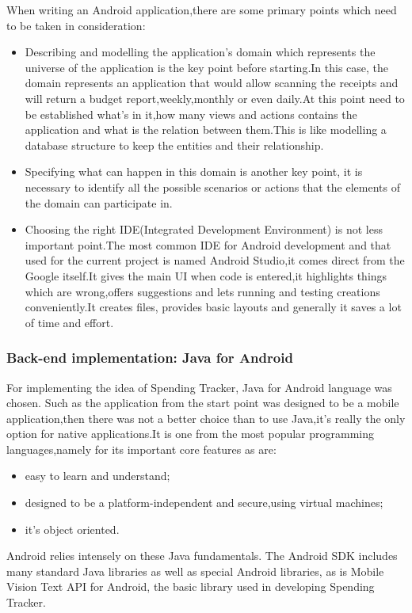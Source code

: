 When writing an Android application,there are some primary points which need to be taken in consideration:
\begin{itemize}
	\item Describing and modelling the application's domain which represents the universe of the application is the key point before starting.In this case, the domain represents an application that would allow scanning the receipts and will return a budget report,weekly,monthly or even daily.At this point need to be established what's in it,how many views and actions contains the application and what is the relation between them.This is like modelling a database structure to keep the entities and their relationship.
	\item Specifying what can happen in this domain is another key point, it is necessary to identify all the possible scenarios or actions that the elements of the domain can participate in.
	\item Choosing the right IDE(Integrated Development Environment) is not less important point.The most common IDE for Android development and that used for the current project is named Android Studio,it comes direct from the Google itself.It gives the main UI when code is entered,it highlights things which are wrong,offers suggestions and lets running and testing creations conveniently.It creates files, provides basic layouts and generally it saves a lot of time and effort.
\end{itemize}
\subsubsection{Back-end implementation: Java for Android}
For implementing the idea of Spending Tracker, Java for Android language was chosen. Such as the application from the start point was designed to be a mobile application,then there was not a better choice than to use Java,it's really the only option for native applications.It is one from the most popular programming languages,namely for its important core features as are: 
\begin{itemize}
	\item easy to learn and understand;
	\item designed to be a platform-independent and secure,using virtual machines;
	\item it's object oriented.
\end{itemize} 
Android relies intensely on these Java fundamentals. The Android SDK includes many standard Java libraries as well as special Android libraries, as is Mobile Vision Text API for Android, the basic library used in developing Spending Tracker.

